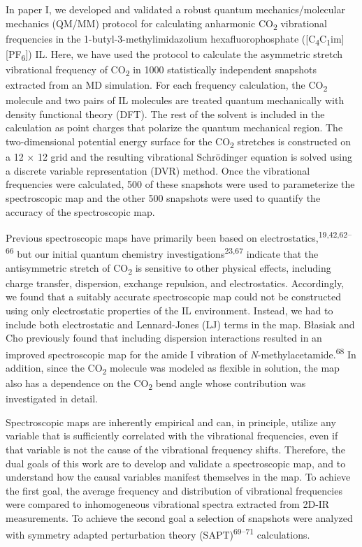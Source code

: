 \documentclass[]{article}
\begin{document}
In paper I, we developed and validated a robust quantum
mechanics/molecular mechanics (QM/MM) protocol for calculating
anharmonic CO\textsubscript{2} vibrational frequencies in the
1-butyl-3-methylimidazolium hexafluorophosphate
({[}C\textsubscript{4}C\textsubscript{1}im{]}{[}PF\textsubscript{6}{]})
IL. Here, we have used the protocol to calculate the asymmetric stretch
vibrational frequency of CO\textsubscript{2} in 1000 statistically
independent snapshots extracted from an MD simulation. For each
frequency calculation, the CO\textsubscript{2} molecule and two pairs of
IL molecules are treated quantum mechanically with density functional
theory (DFT). The rest of the solvent is included in the calculation as
point charges that polarize the quantum mechanical region. The
two-dimensional potential energy surface for the CO\textsubscript{2}
stretches is constructed on a 12 × 12 grid and the resulting vibrational
Schrödinger equation is solved using a discrete variable representation
(DVR) method. Once the vibrational frequencies were calculated, 500 of
these snapshots were used to parameterize the spectroscopic map and the
other 500 snapshots were used to quantify the accuracy of the
spectroscopic map.

Previous spectroscopic maps have primarily been based on
electrostatics,\textsuperscript{19,42,62--66} but our initial quantum
chemistry investigations\textsuperscript{23,67} indicate that the
antisymmetric stretch of CO\textsubscript{2} is sensitive to other
physical effects, including charge transfer, dispersion, exchange
repulsion, and electrostatics. Accordingly, we found that a suitably
accurate spectroscopic map could not be constructed using only
electrostatic properties of the IL environment. Instead, we had to
include both electrostatic and Lennard-Jones (LJ) terms in the map.
Błasiak and Cho previously found that including dispersion interactions
resulted in an improved spectroscopic map for the amide I vibration of
\emph{N}-methylacetamide.\textsuperscript{68} In addition, since the
CO\textsubscript{2} molecule was modeled as flexible in solution, the
map also has a dependence on the CO\textsubscript{2} bend angle whose
contribution was investigated in detail.

Spectroscopic maps are inherently empirical and can, in principle,
utilize any variable that is sufficiently correlated with the
vibrational frequencies, even if that variable is not the cause of the
vibrational frequency shifts. Therefore, the dual goals of this work are
to develop and validate a spectroscopic map, and to understand how the
causal variables manifest themselves in the map. To achieve the first
goal, the average frequency and distribution of vibrational frequencies
were compared to inhomogeneous vibrational spectra extracted from 2D-IR
measurements. To achieve the second goal a selection of snapshots were
analyzed with symmetry adapted perturbation theory
(SAPT)\textsuperscript{69--71} calculations.
\end{document}
